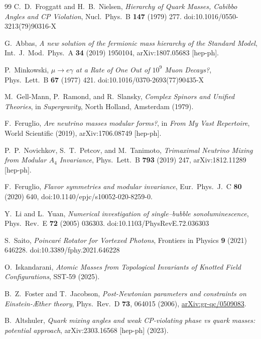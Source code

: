 \documentclass[11pt]{article}
\begin{document}
\begin{thebibliography}{99}
        C.~D.~Froggatt and H.~B.~Nielsen,
        \emph{Hierarchy of Quark Masses, Cabibbo Angles and CP Violation},
        Nucl.\ Phys.\ B \textbf{147} (1979) 277.
        doi:10.1016/0550-3213(79)90316-X

        G.~Abbas,
        \emph{A new solution of the fermionic mass hierarchy of the Standard Model},
        Int.\ J.\ Mod.\ Phys.\ A \textbf{34} (2019) 1950104,
        arXiv:1807.05683 [hep-ph].

        P.~Minkowski,
        \emph{$\mu \rightarrow e\gamma$ at a Rate of One Out of $10^{9}$ Muon Decays?},
        Phys.\ Lett.\ B \textbf{67} (1977) 421.
        doi:10.1016/0370-2693(77)90435-X

        M.~Gell-Mann, P.~Ramond, and R.~Slansky,
        \emph{Complex Spinors and Unified Theories},
        in \emph{Supergravity}, North Holland, Amsterdam (1979).

        F.~Feruglio,
        \emph{Are neutrino masses modular forms?},
        in \emph{From My Vast Repertoire}, World Scientific (2019),
        arXiv:1706.08749 [hep-ph].

        P.~P.~Novichkov, S.~T.~Petcov, and M.~Tanimoto,
        \emph{Trimaximal Neutrino Mixing from Modular $A_4$ Invariance},
        Phys.\ Lett.\ B \textbf{793} (2019) 247,
        arXiv:1812.11289 [hep-ph].

        F.~Feruglio,
        \emph{Flavor symmetries and modular invariance},
        Eur.\ Phys.\ J.\ C \textbf{80} (2020) 640,
        doi:10.1140/epjc/s10052-020-8259-0.

        Y.~Li and L.~Yuan,
        \emph{Numerical investigation of single--bubble sonoluminescence},
        Phys.\ Rev.\ E \textbf{72} (2005) 036303.
        doi:10.1103/PhysRevE.72.036303

        S.~Saito,
        \emph{Poincar\'e Rotator for Vortexed Photons},
        Frontiers in Physics \textbf{9} (2021) 646228.
        doi:10.3389/fphy.2021.646228

        O.~Iskandarani,
        \emph{Atomic Masses from Topological Invariants of Knotted Field Configurations},
        SST-59 (2025).

        B.~Z.~Foster and T.~Jacobson,
        \emph{Post-Newtonian parameters and constraints on Einstein-\AE ther theory},
        Phys.\ Rev.\ D \textbf{73}, 064015 (2006),
        \href{https://arxiv.org/abs/gr-qc/0509083}{arXiv:gr-qc/0509083}.

        B.~Altshuler,
        \emph{Quark mixing angles and weak CP-violating phase vs quark masses:
        potential approach},
        arXiv:2303.16568 [hep-ph] (2023).

    \end{thebibliography}
\end{document}
